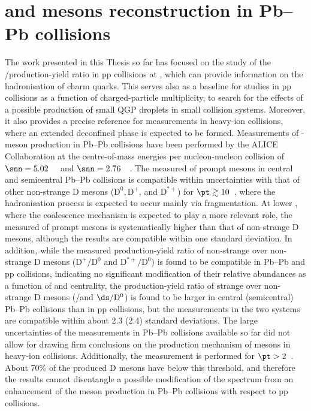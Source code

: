 \chapter{\texorpdfstring{\ds and \dpl mesons reconstruction in Pb--Pb collisions}{Ds+ and D+ mesons reconstruction in Pb--Pb collisions}}
The work presented in this Thesis so far has focused on the study of the \ds/\dpl production-yield ratio in pp collisions at \thirteen, which can provide information on the hadronisation of charm quarks. This serves also as a baseline for studies in pp collisions as a function of charged-particle multiplicity, to search for the effects of a possible production of small QGP droplets in small collision systems. Moreover, it also provides a precise reference for measurements in heavy-ion collisions, where an extended deconfined phase is expected to be formed. Measurements of \ds-meson production in Pb--Pb collisions have been performed by the ALICE Collaboration at the centre-of-mass energies per nucleon-nucleon collision of $\snn=5.02$~\tev~\cite{ALICE:2021kfc,ALICE:2018lyv} and $\snn=2.76$~\tev~\cite{ALICE:2015dry}. The measured \raa of prompt \ds mesons in central and semicentral Pb--Pb collisions is compatible within uncertainties with that of other non-strange D mesons ($\mathrm{D^0, D^+}$, and $\mathrm{D^{*+}}$) for $\pt\gtrsim10$~\gevc, where the hadronisation process is expected to occur mainly via fragmentation. At lower \pt, where the coalescence mechanism is expected to play a more relevant role, the measured \raa of prompt \ds mesons is systematically higher than that of non-strange D mesons, although the results are compatible within one standard deviation. In addition, while the measured production-yield ratio of non-strange over non-strange D mesons ($\mathrm{D^+/D^0}$ and $\mathrm{D^{*+}/D^0}$) is found to be compatible in Pb--Pb and pp collisions, indicating no significant modification of their relative abundances as a function of \pt and centrality, the production-yield ratio of strange over non-strange D mesons (\ds/\dpl and $\ds/\mathrm{D^0}$) is found to be larger in central (semicentral) Pb--Pb collisions than in pp collisions, but the measurements in the two systems are compatible within about 2.3 (2.4) standard deviations. The large uncertainties of the measurements in Pb--Pb collisions available so far did not allow for drawing firm conclusions on the production mechanism of \ds mesons in heavy-ion collisions. Additionally, the measurement is performed for $\pt>2$~\gevc. About 70\% of the produced D mesons have \pt below this threshold, and therefore the results cannot disentangle a possible modification of the \pt spectrum from an enhancement of the \ds meson production in Pb--Pb collisions with respect to pp collisions.

